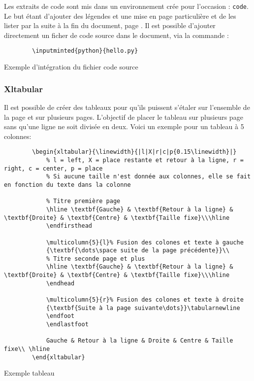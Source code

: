Les extraits de code sont mis dans un environnement crée pour l'occasion : \verb=code=.
Le but étant d'ajouter des légendes et une mise en page particulière et de les lister par la suite à la fin du document,
page \pageref{TableOfCode}.
Il est possible d'ajouter directement un ficher de code source dans le document, via la commande :
\begin{code}
    \begin{verbatim}
        \inputminted{python}{hello.py}
\end{verbatim}
    \caption{Exemple d'intégration du fichier code source}
\end{code}

\subsubsection{Xltabular}
Il est possible de créer des tableaux pour qu'ils puissent s'étaler sur l'ensemble de la page et sur plusieurs pages.
L'objectif de placer le tableau sur plusieurs page sans qu'une ligne ne soit divisée en deux.
Voici un exemple pour un tableau à 5 colonnes:
\begin{code}
    \begin{verbatim}
        \begin{xltabular}{\linewidth}{|l|X|r|c|p{0.15\linewidth}|}
            % l = left, X = place restante et retour à la ligne, r = right, c = center, p = place
            % Si aucune taille n'est donnée aux colonnes, elle se fait en fonction du texte dans la colonne

            % Titre première page
            \hline \textbf{Gauche} & \textbf{Retour à la ligne} & \textbf{Droite} & \textbf{Centre} & \textbf{Taille fixe}\\\hline
            \endfirsthead

            \multicolumn{5}{l}% Fusion des colones et texte à gauche
            {\textbf{\dots\space suite de la page précédente}}\\
            % Titre seconde page et plus
            \hline \textbf{Gauche} & \textbf{Retour à la ligne} & \textbf{Droite} & \textbf{Centre} & \textbf{Taille fixe}\\\hline
            \endhead

            \multicolumn{5}{r}% Fusion des colones et texte à droite
            {\textbf{Suite à la page suivante\dots}}\tabularnewline
            \endfoot
            \endlastfoot

            Gauche & Retour à la ligne & Droite & Centre & Taille fixe\\ \hline
        \end{xltabular}
\end{verbatim}
    \caption{Exemple tableau}
\end{code}

